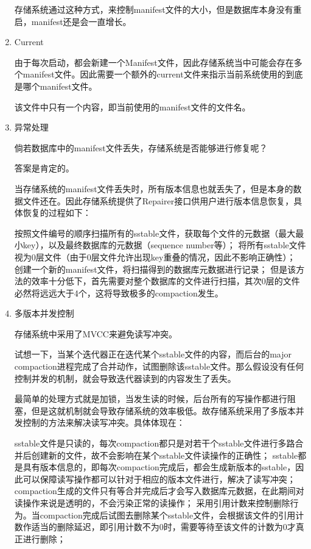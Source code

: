 \begin{enumerate}
存储系统通过这种方式，来控制manifest文件的大小，但是数据库本身没有重启，manifest还是会一直增长。


		\item Current

由于每次启动，都会新建一个Manifest文件，因此存储系统当中可能会存在多个manifest文件。因此需要一个额外的current文件来指示当前系统使用的到底是哪个manifest文件。

该文件中只有一个内容，即当前使用的manifest文件的文件名。

		\item 异常处理

倘若数据库中的manifest文件丢失，存储系统是否能够进行修复呢？



答案是肯定的。

当存储系统的manifest文件丢失时，所有版本信息也就丢失了，但是本身的数据文件还在。因此存储系统提供了Repairer接口供用户进行版本信息恢复，具体恢复的过程如下：

按照文件编号的顺序扫描所有的sstable文件，获取每个文件的元数据（最大最小key），以及最终数据库的元数据（sequence number等）；
将所有sstable文件视为0层文件（由于0层文件允许出现key重叠的情况，因此不影响正确性）；
创建一个新的manifest文件，将扫描得到的数据库元数据进行记录；
但是该方法的效率十分低下，首先需要对整个数据库的文件进行扫描，其次0层的文件必然将远远大于4个，这将导致极多的compaction发生。

		\item 多版本并发控制

存储系统中采用了MVCC来避免读写冲突。

试想一下，当某个迭代器正在迭代某个sstable文件的内容，而后台的major compaction进程完成了合并动作，试图删除该sstable文件。那么假设没有任何控制并发的机制，就会导致迭代器读到的内容发生了丢失。

最简单的处理方式就是加锁，当发生读的时候，后台所有的写操作都进行阻塞，但是这就机制就会导致存储系统的效率极低。故存储系统采用了多版本并发控制的方法来解决读写冲突。具体体现在：

sstable文件是只读的，每次compaction都只是对若干个sstable文件进行多路合并后创建新的文件，故不会影响在某个sstable文件读操作的正确性；
sstable都是具有版本信息的，即每次compaction完成后，都会生成新版本的sstable，因此可以保障读写操作都可以针对于相应的版本文件进行，解决了读写冲突；
compaction生成的文件只有等合并完成后才会写入数据库元数据，在此期间对读操作来说是透明的，不会污染正常的读操作；
采用引用计数来控制删除行为。当compaction完成后试图去删除某个sstable文件，会根据该文件的引用计数作适当的删除延迟，即引用计数不为0时，需要等待至该文件的计数为0才真正进行删除；


		
\end{enumerate}